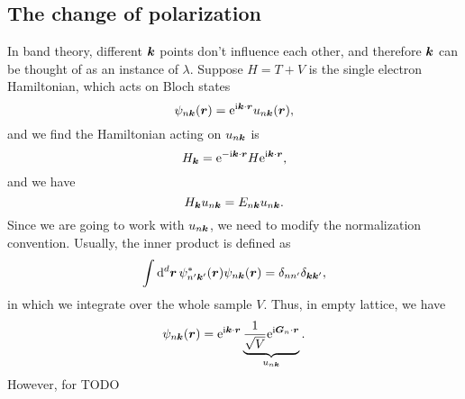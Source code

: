 \documentclass[hyperref, a4paper]{article}
\newcommand*{\ii}{\mathrm{i}}
\newcommand*{\ee}{\mathrm{e}}
\begin{document}
\subsection{The change of polarization}

In band theory, different $\vb*{k}$ points don't 
influence each other, 
and therefore $\vb*{k}$ can be thought of 
as an instance of $\lambda$.
Suppose $H = T + V$ is the single electron Hamiltonian,
which acts on Bloch states 
\begin{equation}
    \psi_{n \vb*{k}}(\vb*{r}) = \ee^{\ii \vb*{k} \cdot \vb*{r}} u_{n \vb*{k}}(\vb*{r}),
\end{equation}
and we find the Hamiltonian acting on $u_{n \vb*{k}}$ is 
\begin{equation}
    H_{\vb*{k}} = \ee^{- \ii \vb*{k} \cdot \vb*{r}} H \ee^{\ii \vb*{k} \cdot \vb*{r}},
\end{equation}
and we have 
\begin{equation}
    H_{\vb*{k}} u_{n \vb*{k}} = E_{n \vb*{k}} u_{n \vb*{k}}.
\end{equation}
Since we are going to work with $u_{n \vb*{k}}$, 
we need to modify the normalization convention.
Usually, the inner product is defined as 
\begin{equation}
    \int \dd[d]{\vb*{r}} \psi^*_{n' \vb*{k}'}(\vb*{r}) \psi_{n \vb*{k}}(\vb*{r})
    = \delta_{n n'} \delta_{\vb*{k} \vb*{k}'},
\end{equation}
in which we integrate over the whole sample $V$.
Thus, in empty lattice, we have 
\begin{equation}
    \psi_{n \vb*{k}}(\vb*{r}) = \ee^{\ii \vb*{k} \cdot \vb*{r}}
    \underbrace{
        \frac{1}{\sqrt{V}} \ee^{\ii \vb*{G}_n \cdot \vb*{r}}
    }_{u_{n \vb*{k}}}.
\end{equation}
However, for TODO 
\end{document}
